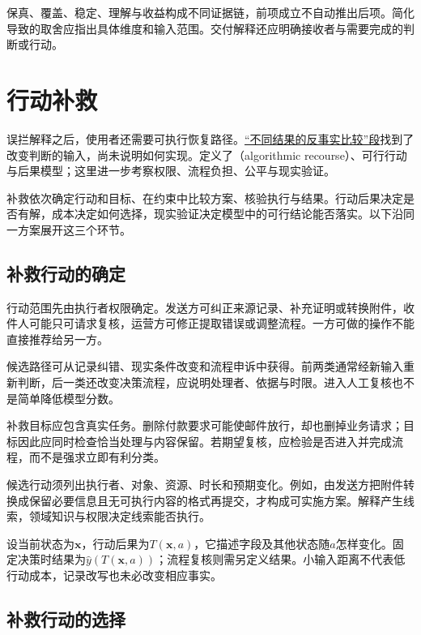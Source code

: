 保真、覆盖、稳定、理解与收益构成不同证据链，前项成立不自动推出后项。简化导致的取舍应指出具体维度和输入范围。交付解释还应明确接收者与需要完成的判断或行动。

\section{行动补救}
\label{sec:interpretability-recourse}

误拦解释之后，使用者还需要可执行恢复路径。\hyperref[sec:interpretability-local-counterfactual]{“不同结果的反事实比较”段}找到了改变判断的输入，尚未说明如何实现。定义了（algorithmic recourse）、可行行动与后果模型；这里进一步考察权限、流程负担、公平与现实验证。

补救依次确定行动和目标、在约束中比较方案、核验执行与结果。行动后果决定是否有解，成本决定如何选择，现实验证决定模型中的可行结论能否落实。以下沿同一方案展开这三个环节。

\subsection{补救行动的确定}
\label{sec:interpretability-recourse-target}

行动范围先由执行者权限确定。发送方可纠正来源记录、补充证明或转换附件，收件人可能只可请求复核，运营方可修正提取错误或调整流程。一方可做的操作不能直接推荐给另一方。

候选路径可从记录纠错、现实条件改变和流程申诉中获得。前两类通常经新输入重新判断，后一类还改变决策流程，应说明处理者、依据与时限。进入人工复核也不是简单降低模型分数。

补救目标应包含真实任务。删除付款要求可能使邮件放行，却也删掉业务请求；目标因此应同时检查恰当处理与内容保留。若期望复核，应检验是否进入并完成流程，而不是强求立即有利分类。

候选行动须列出执行者、对象、资源、时长和预期变化。例如，由发送方把附件转换成保留必要信息且无可执行内容的格式再提交，才构成可实施方案。解释产生线索，领域知识与权限决定线索能否执行。

设当前状态为$\bm x$，行动后果为$T(\bm x,a)$，它描述字段及其他状态随$a$怎样变化。固定决策时结果为$\hat y(T(\bm x,a))$；流程复核则需另定义结果。小输入距离不代表低行动成本，记录改写也未必改变相应事实。

\subsection{补救行动的选择}
\label{sec:interpretability-recourse-action}

